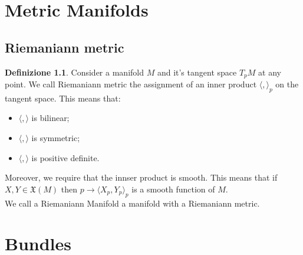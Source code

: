 \documentclass[12pt,a4paper]{report}
\theoremstyle{definition}
\newtheorem{Def}{Definizione}[chapter]
\theoremstyle{Theorem}
\theoremstyle{definition}
\theoremstyle{definition}
\theoremstyle{definition}
\begin{document}
	\chapter{Metric Manifolds}
	\section{Riemaniann metric}
	\begin{Def}
		Consider a manifold $M$ and it's tangent space $T_pM$ at any point. We call Riemaniann metric the assignment of an inner product $\langle,\rangle_p$ on the tangent space. This means that:
		\begin{itemize}
			\item $\langle,\rangle$ is bilinear;
			\item $\langle,\rangle$ is symmetric;
			\item $\langle,\rangle$ is positive definite.
		\end{itemize}
		Moreover, we require that the innser product is smooth. This means that if $X,Y\in\mathfrak{X}(M)$ then $p\rightarrow\langle X_p,Y_p\rangle_p$ is a smooth function of $M$.\\
		We call a Riemaniann Manifold a manifold with a Riemaniann metric.
	\end{Def}
	\chapter{Bundles}
\end{document}
